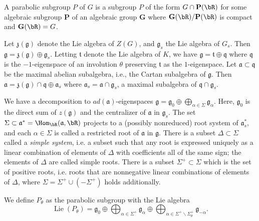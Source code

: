 A parabolic subgroup $P$ of $G$ is a subgroup $P$ of the form 
$G \cap \mathbf{P}(\bR)$ for some algebraic subgroup $\mathbf{P}$ of an algebraic group $\mathbf{G}$ 
where $\mathbf{G}(\bR)/\mathbf{P}(\bR)$ is compact
and $\mathbf{G}(\bR) = G$. 

Let $\mathfrak{z}(\mathfrak{g})$ denote the Lie algebra of $Z(G)$, 
and $\mathfrak{g}_s$ the Lie algebra of $G_s$. 
Then $\mathfrak{g} = \mathfrak{z}(\mathfrak{g}) \oplus \mathfrak{g}_s$.
Letting $\mathfrak{t}$ denote the Lie algebra of $K$, 
we have $\mathfrak{g} = \mathfrak{t} \oplus \mathfrak{q}$ 
where $\mathfrak{q}$ is the $-1$-eigenspace of an involution $\theta$ preserving 
$\mathfrak{t}$ as the $1$-eigenspace.  
Let $\mathfrak{a} \subset \mathfrak{q}$ be the maximal abelian subalgebra, i.e., the Cartan subalgebra of 
$\mathfrak{g}$. Then $\mathfrak{a} = \mathfrak{z}(\mathfrak{g}) \cap \mathfrak{q} \oplus \mathfrak{a}_s$ 
where $\mathfrak{a}_s = \mathfrak{a} \cap \mathfrak{g}_s$, a maximal  subalgebra of 
$\mathfrak{q} \cap \mathfrak{g}_s$. 

We have a decomposition to $ad(\mathfrak{a})$-eigenspaces
 $\mathfrak{g}=\mathfrak{g}_{0} \oplus \bigoplus_{\alpha \in \Sigma} \mathfrak{g}_{\alpha}$.
 Here, 
 $\mathfrak{g}_{0}$ is the direct sum of $z(\mathfrak{g})$ and the centralizer of $\mathfrak{a}$ in $\mathfrak{g}_{s} $. 
 The set $\Sigma \subset \mathfrak{a}^{*}= \Hom_{\bR}(\mathfrak{a}, \bR)$ projects to a (possibly nonreduced) root system of $\mathfrak{a}_{s}^{*},$ and each $\alpha \in \Sigma$ is called a restricted root of $\mathfrak{a}$ in $\mathfrak{g}$.
 There is a subset 
$\Delta \subset \Sigma$ called a {\em simple system},  i.e. a subset such that any root is expressed 
uniquely as a linear combination of elements of $\Delta$ with coefficients all of the same sign; 
the elements of $\Delta$ are called simple roots.
There is a subset
$\Sigma^{+} \subset \Sigma$ which is the set of positive roots, i.e. 
 roots that are nonnegative linear combinations of elements of $\Delta$, where 
 $\Sigma=\Sigma^{+} \cup\left(-\Sigma^{+}\right)$ holds additionally. 

We define $P_\theta$ as the parabolic subgroup with the Lie algebra
\[\operatorname{Lie}\left(P_{\theta}\right)=\mathfrak{g}_{0} \oplus \bigoplus_{\alpha \in \Sigma^{+}} \mathfrak{g}_{\alpha} \oplus \bigoplus_{\alpha \in \Sigma^{+} \backslash \Sigma_{\theta}^{+}} \mathfrak{g}_{-\alpha}.\]

